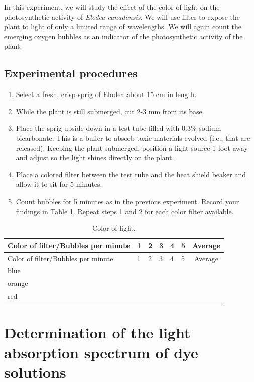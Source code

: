 \documentclass[]{book}
\providecommand{\tightlist}{%
  \setlength{\itemsep}{0pt}\setlength{\parskip}{0pt}}
\theoremstyle{definition}
\theoremstyle{definition}
\theoremstyle{definition}
\theoremstyle{remark}
\begin{document}
In this experiment, we will study the effect of the color of light on
the photosynthetic activity of \emph{Elodea canadensis}. We will use
filter to expose the plant to light of only a limited range of
wavelengths. We will again count the emerging oxygen bubbles as an
indicator of the photosynthetic activity of the plant.

\subsection{Experimental procedures}\label{experimental-procedures-25}

\begin{enumerate}
\def\labelenumi{\arabic{enumi}.}
\tightlist
\item
  Select a fresh, crisp sprig of Elodea about 15 cm in length.
\item
  While the plant is still submerged, cut 2-3 mm from its base.
\item
  Place the sprig upside down in a test tube filled with 0.3\% sodium
  bicarbonate. This is a buffer to absorb toxic materials evolved (i.e.,
  that are released). Keeping the plant submerged, position a light
  source 1 foot away and adjust so the light shines directly on the
  plant.
\item
  Place a colored filter between the test tube and the heat shield
  beaker and allow it to sit for 5 minutes.
\item
  Count bubbles for 5 minutes as in the previous experiment. Record your
  findings in Table \ref{tab:color}. Repeat steps 1 and 2 for each color
  filter available.
\end{enumerate}

\begin{longtable}[]{@{}llllllc@{}}
\caption{\label{tab:color} Color of light.}\tabularnewline
\toprule
Color of filter/Bubbles per minute & 1 & 2 & 3 & 4 & 5 &
Average\tabularnewline
\midrule
\endfirsthead
\toprule
Color of filter/Bubbles per minute & 1 & 2 & 3 & 4 & 5 &
Average\tabularnewline
\midrule
\endhead
blue & & & & & &\tabularnewline
orange & & & & & &\tabularnewline
red & & & & & &\tabularnewline
\bottomrule
\end{longtable}

\section{Determination of the light absorption spectrum of dye
solutions}\label{determination-of-the-light-absorption-spectrum-of-dye-solutions}
\end{document}
